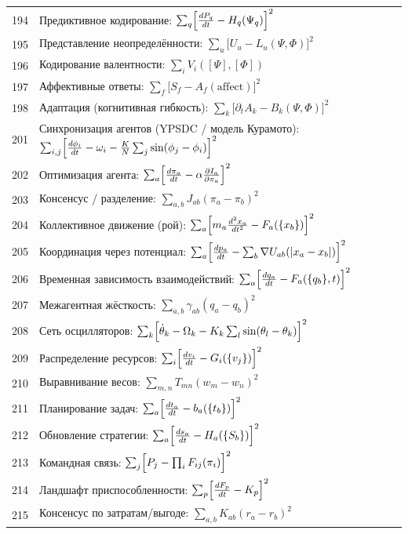 \documentclass[12pt,a4paper]{article}
\begin{document}
\begin{longtable}{r l}
		194 & Предиктивное кодирование: $\sum_q\Bigl[\frac{dP_q}{dt} - H_q(\Psi_q)\Bigr]^2$ \\
		195 & Представление неопределённости: $\sum_u\bigl[U_u - L_u(\Psi,\Phi)\bigr]^2$ \\
		196 & Кодирование валентности: $\sum_i V_i([\Psi],[\Phi])$ \\
		197 & Аффективные ответы: $\sum_f\bigl[S_f - A_f(\text{affect})\bigr]^2$ \\
		198 & Адаптация (когнитивная гибкость): $\sum_k\bigl[\partial_t A_k - B_k(\Psi,\Phi)\bigr]^2$ \\
		201 & Синхронизация агентов (YPSDC / модель Курамото): $\sum_{i,j}\Bigl[\frac{d\phi_i}{dt} - \omega_i - \frac{K}{N}\sum_j\sin(\phi_j-\phi_i)\Bigr]^2$ \\
		202 & Оптимизация агента: $\sum_a\Bigl[\frac{d\pi_a}{dt} - \alpha\frac{\partial I_a}{\partial\pi_a}\Bigr]^2$ \\
		203 & Консенсус / разделение: $\sum_{a,b}J_{ab}(\pi_a - \pi_b)^2$ \\
		204 & Коллективное движение (рой): $\sum_a\Bigl[m_a\frac{d^2 x_a}{dt^2} - F_a(\{x_b\})\Bigr]^2$ \\
		205 & Координация через потенциал: $\sum_a\Bigl[\frac{dp_a}{dt} - \sum_b\nabla U_{ab}(|x_a-x_b|)\Bigr]^2$ \\
		206 & Временная зависимость взаимодействий: $\sum_a\Bigl[\frac{dq_a}{dt} - F_a(\{q_b\},t)\Bigr]^2$ \\
		207 & Межагентная жёсткость: $\sum_{a,b}\gamma_{ab}(q_a - q_b)^2$ \\
		208 & Сеть осцилляторов: $\sum_k\Bigl[\dot\theta_k - \Omega_k - K_k\sum_l\sin(\theta_l-\theta_k)\Bigr]^2$ \\
		209 & Распределение ресурсов: $\sum_i\Bigl[\frac{dv_i}{dt} - G_i(\{v_j\})\Bigr]^2$ \\
		210 & Выравнивание весов: $\sum_{m,n}T_{mn}(w_m - w_n)^2$ \\
		211 & Планирование задач: $\sum_a\Bigl[\frac{dt_a}{dt} - b_a(\{t_b\})\Bigr]^2$ \\
		212 & Обновление стратегии: $\sum_a\Bigl[\frac{ds_a}{dt} - H_a(\{S_b\})\Bigr]^2$ \\
		213 & Командная связь: $\sum_j\Bigl[P_j - \prod_i F_{ij}(\pi_i)\Bigr]^2$ \\
		214 & Ландшафт приспособленности: $\sum_p\Bigl[\frac{dF_p}{dt} - K_p\Bigr]^2$ \\
		215 & Консенсус по затратам/выгоде: $\sum_{a,b}K_{ab}(r_a - r_b)^2$ \\

\end{longtable}
\end{document}
